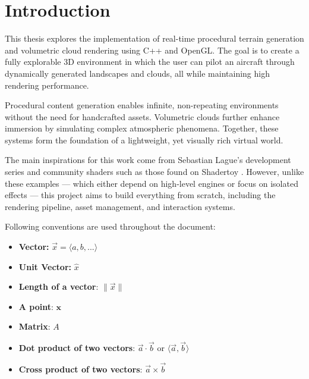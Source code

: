 \chapter{Introduction}
\label{ch:intro}




This thesis explores the implementation of real-time procedural terrain generation and volumetric cloud rendering using C++ and OpenGL. The goal is to create a fully explorable 3D environment in which the user can pilot an aircraft through dynamically generated landscapes and clouds, all while maintaining high rendering performance.

Procedural content generation enables infinite, non-repeating environments without the need for handcrafted assets. Volumetric clouds further enhance immersion by simulating complex atmospheric phenomena. Together, these systems form the foundation of a lightweight, yet visually rich virtual world.

The main inspirations for this work come from Sebastian Lague's development series \cite{sebestianlague2019} and community shaders such as those found on Shadertoy \cite{shadertoy2013} \cite{reinder2018}. However, unlike these examples — which either depend on high-level engines or focus on isolated effects — this project aims to build everything from scratch, including the rendering pipeline, asset management, and interaction systems.

Following conventions are used throughout the document:

\begin{itemize}[noitemsep, topsep=0pt]
    \item \textbf{Vector:} $\vec{x} = \langle a, b, ... \rangle$
    \item \textbf{Unit Vector:} $\hat{x}$
    \item \textbf{Length of a vector}: $\|\vec{x}\|$
    \item \textbf{A point}: $\textbf{x}$
    \item \textbf{Matrix}: $A$
    \item \textbf{Dot product of two vectors}: 
    $ \vec{a} \cdot \vec{b} $ or 
    $ \langle \vec{a}, \vec{b} \rangle $
    \item \textbf{Cross product of two vectors}:
    $ \vec{a} \times \vec{b} $
\end{itemize}